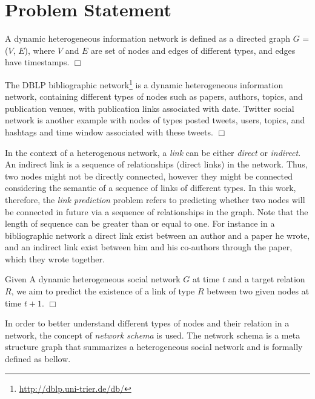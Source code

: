 \section{Problem Statement}

\begin{definition}
A dynamic heterogeneous information network is defined as a directed graph $G$ = ($V$, $E$), where $V$ and $E$ are set of nodes and edges of different types, and edges have timestamps. $\Box$ \cite{check with standard definition of HIN in J. Han paper}
\end{definition}

\begin{example}
The DBLP bibliographic network\footnote{\url{http://dblp.uni-trier.de/db/}} is a dynamic heterogeneous information network, containing different types of nodes such as papers, authors, topics, and publication venues, with publication links associated with date. Twitter social network is another example with nodes of types posted tweets, users, topics, and hashtags and time window associated with these tweets. $\Box$
\end{example}

In the context of a heterogenous network, a \textit{link} can be either \textit{direct} or \textit{indirect}. An indirect link is a sequence of relationships (direct links) in the network. Thus, two nodes might not be directly connected, however they might be connected considering the semantic of a sequence of links of different types. In this work, therefore, the \textit{link prediction} problem refers to predicting whether two nodes will be connected in future via a sequence of relationships in the graph. Note that the length of sequence can be greater than or equal to one. For instance in a bibliographic network a direct link exist between an author and a paper he wrote, and an indirect link exist between him and his co-authors through the paper, which they wrote together.

\begin{definition}\label{problemdef}
 Given A dynamic heterogeneous social network $G$ at time $t$ and a target relation $R$, we aim to predict the existence of a link of type $R$ between two given nodes at time $t+1$. $\Box$
 \end{definition}

In order to better understand different types of nodes and their relation in a network, the concept of \textit{network schema} \cite{sun2011pathsim} is used. The network schema is a meta structure graph that summarizes a heterogeneous social network and is formally defined as bellow.

